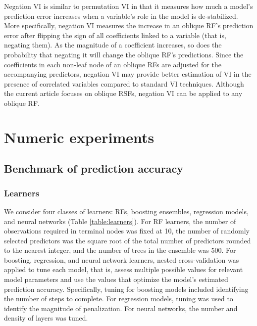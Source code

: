 \documentclass[twoside,11pt]{article}\usepackage[]{graphicx}\usepackage[]{xcolor}
\newcommand{\ie}{that is}
\begin{document}
Negation VI is similar to permutation VI in that it measures how much a model’s prediction error increases when a variable’s role in the model is de-stabilized. More specifically, negation VI measures the increase in an oblique RF's prediction error after flipping the sign of all coefficients linked to a variable (\ie, negating them). As the magnitude of a coefficient increases, so does the probability that negating it will change the oblique RF's predictions. Since the coefficients in each non-leaf node of an oblique RFs are adjusted for the accompanying predictors, negation VI may provide better estimation of VI in the presence of correlated variables compared to standard VI techniques. Although the current article focuses on oblique RSFs, negation VI can be applied to any oblique RF.

\section{Numeric experiments}

\subsection{Benchmark of prediction accuracy}

\subsubsection{Learners}

We consider four classes of learners: RFs, boosting ensembles, regression models, and neural networks (Table \ref{table:learners}). For RF learners, the number of observations required in terminal nodes was fixed at 10, the number of randomly selected predictors was the square root of the total number of predictors rounded to the nearest integer, and the number of trees in the ensemble was 500. For boosting, regression, and neural network learners, nested cross-validation was applied to tune each model, \ie, assess multiple possible values for relevant model parameters and use the values that optimize the model's estimated prediction accuracy. Specifically, tuning for boosting models included identifying the number of steps to complete. For regression models, tuning was used to identify the magnitude of penalization. For neural networks, the number and density of layers was tuned.
\end{document}

